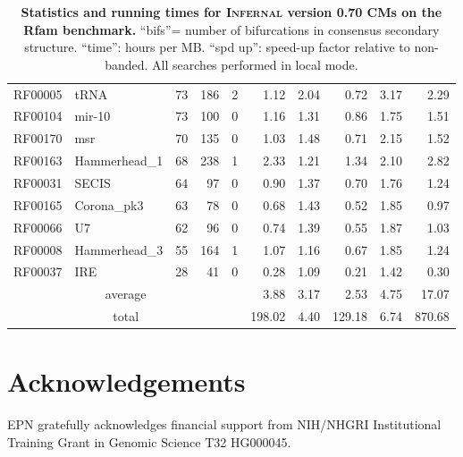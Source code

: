 \documentclass[11pt]{article}
\begin{document}
\begin{table}
\begin{center}
\begin{tabular}{|ll|rrr|rr|rr|r|}
RF00005 & tRNA & 73 & 186 & 2 & 1.12 & 2.04 & 0.72 & 3.17 & 2.29 \\  
RF00104 & mir-10 & 73 & 100 & 0 & 1.16 & 1.31 & 0.86 & 1.75 & 1.51 \\  
RF00170 & msr & 70 & 135 & 0 & 1.03 & 1.48 & 0.71 & 2.15 & 1.52 \\  
RF00163 & Hammerhead\_1 & 68 & 238 & 1 & 2.33 & 1.21 & 1.34 & 2.10 & 2.82 \\  
RF00031 & SECIS & 64 & 97 & 0 & 0.90 & 1.37 & 0.70 & 1.76 & 1.24 \\  
RF00165 & Corona\_pk3 & 63 & 78 & 0 & 0.68 & 1.43 & 0.52 & 1.85 & 0.97 \\  
RF00066 & U7 & 62 & 96 & 0 & 0.74 & 1.39 & 0.55 & 1.87 & 1.03 \\  
RF00008 & Hammerhead\_3 & 55 & 164 & 1 & 1.07 & 1.16 & 0.67 & 1.85 & 1.24 \\  
RF00037 & IRE & 28 & 41 & 0 & 0.28 & 1.09 & 0.21 & 1.42 & 0.30 \\ \hline 
\multicolumn{5}{|c|}{average} & 3.88 & 3.17 & 2.53 & 4.75 & 17.07 \\ 
\multicolumn{5}{|c|}{total}   & 198.02 & 4.40 & 129.18 & 6.74 & 870.68 \\ \hline 
\end{tabular}
\end{center}

\caption{\textbf{Statistics and running times for
      \textsc{Infernal} version 0.70 CMs on the Rfam benchmark.} ``bifs''=
      number of bifurcations in consensus secondary
      structure. ``time'': hours per MB. ``spd up'': speed-up factor
      relative to non-banded. All searches performed in local mode.}
\label{tbl:rmarkbtimes_l}
\end{table}
\fi

\section{Acknowledgements}
EPN gratefully acknowledges financial support from NIH/NHGRI
Institutional Training Grant in Genomic Science T32 HG000045.



\newpage
%

\end{document}
